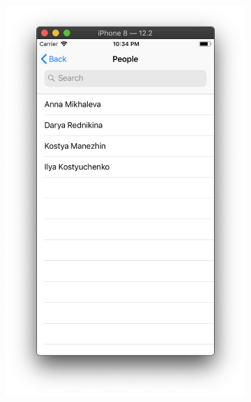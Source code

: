 \documentclass[a4paper,12pt]{article}
\begin{document}
\begin{figure}[h!]
\begin{subfigure}[b]{0.3\linewidth}
			\includegraphics[width=\linewidth]{../includes/pmi/choose_peple.png}
		\end{subfigure}
		\begin{subfigure}[b]{0.3\linewidth}

\end{subfigure}
\end{figure}
\end{document}
